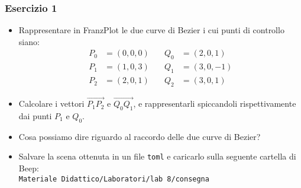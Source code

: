 \documentclass{beamer}
\newcommand{\frnzplt}{FranzPlot }
\begin{document}
%
\begin{frame}
\frametitle{Esercizio 1}
\begin{itemize}
\item Rappresentare in \frnzplt le due curve di Bezier i cui punti di controllo siano:
\begin{align*}
    P_0 &= (0,0,0) \quad & Q_0 &= (2, 0, 1)\\
    P_1 &= (1,0,3) \quad & Q_1 &= (3, 0, -1)\\
    P_2 &= (2,0,1) \quad & Q_2 &= (3, 0, 1)
\end{align*}
\item Calcolare i vettori $\overrightarrow{P_1 P_2}$ e $\overrightarrow{Q_0 Q_1}$, e rappresentarli spiccandoli rispettivamente
    dai punti $P_1$ e $Q_0$.
\item Cosa possiamo dire riguardo al raccordo delle due curve di Bezier?
                \item Salvare la scena ottenuta in un file \texttt{toml} e caricarlo sulla seguente cartella di Beep: \\
                    \texttt{Materiale Didattico/Laboratori/lab 8/consegna}
\end{itemize}
\end{frame}
%
\end{document}

